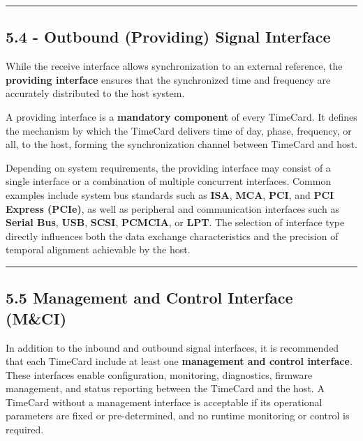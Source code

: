 \begin{center}\rule{0.5\linewidth}{0.5pt}\end{center}

\subsection{5.4 - Outbound (Providing) Signal
Interface}\label{outbound-providing-signal-interface}

While the receive interface allows synchronization to an external
reference, the \textbf{providing interface} ensures that the
synchronized time and frequency are accurately distributed to the host
system.

A providing interface is a \textbf{mandatory component} of every
TimeCard. It defines the mechanism by which the TimeCard delivers time
of day, phase, frequency, or all, to the host, forming the
synchronization channel between TimeCard and host.

Depending on system requirements, the providing interface may consist of
a single interface or a combination of multiple concurrent interfaces.
Common examples include system bus standards such as \textbf{ISA},
\textbf{MCA}, \textbf{PCI}, and \textbf{PCI Express (PCIe)}, as well as
peripheral and communication interfaces such as \textbf{Serial Bus},
\textbf{USB}, \textbf{SCSI}, \textbf{PCMCIA}, or \textbf{LPT}. The
selection of interface type directly influences both the data exchange
characteristics and the precision of temporal alignment achievable by
the host.

\begin{center}\rule{0.5\linewidth}{0.5pt}\end{center}

\subsection{5.5 Management and Control Interface
(M\&CI)}\label{management-and-control-interface-mci}

In addition to the inbound and outbound signal interfaces, it is
recommended that each TimeCard include at least one \textbf{management
and control interface}. These interfaces enable configuration,
monitoring, diagnostics, firmware management, and status reporting
between the TimeCard and the host. A TimeCard without a management
interface is acceptable if its operational parameters are fixed or
pre-determined, and no runtime monitoring or control is required.

